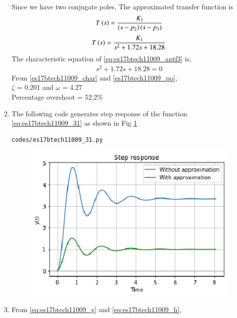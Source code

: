 \begin{enumerate}[label=\thesection.\arabic*.,ref=\thesection.\theenumi]
\begin{table}[!ht]
\centering

\caption{}
\label{table:es17btech11009_t3}
\end{table}
Since we have two conjugate poles, The approximated transfer function is
\begin{align}
T\left(s\right) = \frac{K_1}{\left(s-p_2\right)\left(s-p_3\right)}
\end{align}
\begin{align}
    T\brak{s}= \frac{K_1}{s^2 + 1.72s + 18.28}
    \label{eq:es17btech11009_aptf3}
\end{align}
The characteristic equation of \eqref{eq:es17btech11009_aptf3} is,
\begin{align}
s^2 + 1.72s + 18.28 = 0
 \end{align}
From \eqref{es17btech11009_char} and \eqref{es17btech11009_po},
\\
 $\zeta$ = 0.201 and $\omega$ = 4.27
 \\
 Percentage overshoot = 52.2\%
 \item
The following code generates step response of the function \eqref{eq:es17btech11009_31} as shown in Fig \ref{fig:es17btech11009_fig31}
\begin{lstlisting}
codes/es17btech11009_31.py
\end{lstlisting}
\begin{figure}[!h]
\centering
\includegraphics[width=\columnwidth]{./figs/es17btech11009_31.eps}
\caption{}
\label{fig:es17btech11009_fig31}
\end{figure}
\item
From \eqref{eq:es17btech11009_g} and \eqref{eq:es17btech11009_h},

\end{enumerate}
